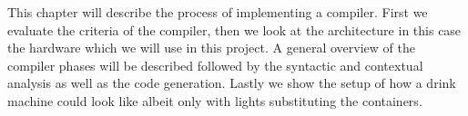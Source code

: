 This chapter will describe the process of implementing a compiler. First we evaluate the criteria of the compiler, then we look at the architecture in this case the hardware which we will use in this project. A general overview of the compiler phases will be described followed by the syntactic and contextual analysis as well as the code generation. Lastly we show the setup of how a drink machine could look like albeit only with lights substituting the containers.
